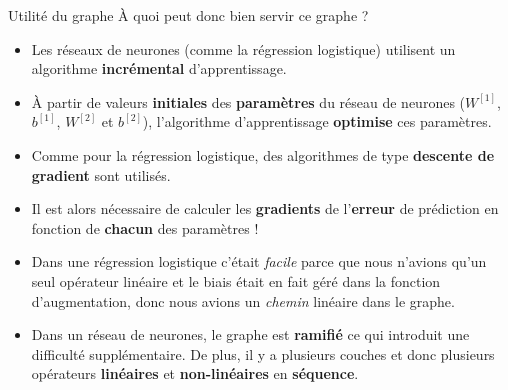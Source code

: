 \begin{frame}{Utilité du graphe}
	\`A quoi peut donc bien servir ce graphe ?
	\pause
	\begin{itemize}
		\item Les réseaux de neurones (comme la régression logistique) utilisent un algorithme \textbf{incrémental} d'apprentissage.
		\pause
		\item \`A partir de valeurs \textbf{initiales} des \textbf{paramètres} du réseau de neurones ($W^{[1]}$, $b^{[1]}$, $W^{[2]}$ et $b^{[2]}$), l'algorithme d'apprentissage \textbf{optimise} ces paramètres.
		\pause
		\item Comme pour la régression logistique, des algorithmes de type \textbf{descente de gradient} sont utilisés.
		\pause
		\item Il est alors nécessaire de calculer les \textbf{gradients} de l'\textbf{erreur} de prédiction en fonction de \textbf{chacun} des paramètres !
		\pause
		\item Dans une régression logistique c'était \textit{facile} parce que nous n'avions qu'un seul opérateur linéaire et le biais était en fait géré dans la fonction d'augmentation, donc nous avions un \textit{chemin} linéaire dans le graphe.
		\pause
		\item Dans un réseau de neurones, le graphe est \textbf{ramifié} ce qui introduit une difficulté supplémentaire. De plus, il y a plusieurs couches et donc plusieurs opérateurs \textbf{linéaires} et \textbf{non-linéaires} en \textbf{séquence}. 
	\end{itemize}
\end{frame}

